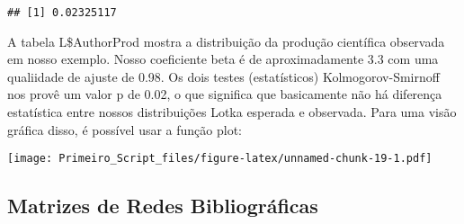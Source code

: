 \documentclass[]{article}
\newenvironment{Shaded}{\begin{snugshade}}{\end{snugshade}}
\newcommand{\DataTypeTok}[1]{\textcolor[rgb]{0.13,0.29,0.53}{#1}}
\newcommand{\DecValTok}[1]{\textcolor[rgb]{0.00,0.00,0.81}{#1}}
\newcommand{\FloatTok}[1]{\textcolor[rgb]{0.00,0.00,0.81}{#1}}
\newcommand{\KeywordTok}[1]{\textcolor[rgb]{0.13,0.29,0.53}{\textbf{#1}}}
\newcommand{\NormalTok}[1]{#1}
\newcommand{\OperatorTok}[1]{\textcolor[rgb]{0.81,0.36,0.00}{\textbf{#1}}}
\newcommand{\StringTok}[1]{\textcolor[rgb]{0.31,0.60,0.02}{#1}}
\begin{document}
\begin{verbatim}
## [1] 0.02325117
\end{verbatim}

A tabela L\$AuthorProd mostra a distribuição da produção científica
observada em nosso exemplo. Nosso coeficiente beta é de aproximadamente
3.3 com uma qualiidade de ajuste de 0.98. Os dois testes (estatísticos)
Kolmogorov-Smirnoff nos provê um valor p de 0.02, o que significa que
basicamente não há diferença estatística entre nossos distribuições
Lotka esperada e observada. Para uma visão gráfica disso, é possível
usar a função plot:

\begin{Shaded}
\end{Shaded}

\texttt{[image: Primeiro\_Script\_files/figure-latex/unnamed-chunk-19-1.pdf]}

\hypertarget{matrizes-de-redes-bibliograficas}{%
\subsection{Matrizes de Redes
Bibliográficas}\label{matrizes-de-redes-bibliograficas}}
\end{document}
